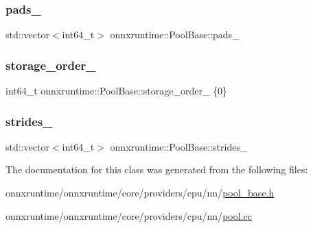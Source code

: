 \subsubsection{\texorpdfstring{pads\+\_\+}{pads\_}}
{\footnotesize\ttfamily std\+::vector$<$int64\+\_\+t$>$ onnxruntime\+::\+Pool\+Base\+::pads\+\_\+\hspace{0.3cm}{\ttfamily [protected]}}

\mbox{\label{classonnxruntime_1_1PoolBase_a8c54de261d31ff7a10f2727759768906}} 
\subsubsection{\texorpdfstring{storage\+\_\+order\+\_\+}{storage\_order\_}}
{\footnotesize\ttfamily int64\+\_\+t onnxruntime\+::\+Pool\+Base\+::storage\+\_\+order\+\_\+ \{0\}\hspace{0.3cm}{\ttfamily [protected]}}

\mbox{\label{classonnxruntime_1_1PoolBase_a12246aa19006cba0dfb1fd125108bb91}} 
\subsubsection{\texorpdfstring{strides\+\_\+}{strides\_}}
{\footnotesize\ttfamily std\+::vector$<$int64\+\_\+t$>$ onnxruntime\+::\+Pool\+Base\+::strides\+\_\+\hspace{0.3cm}{\ttfamily [protected]}}



The documentation for this class was generated from the following files\+:\begin{DoxyCompactItemize}
\item 
onnxruntime/onnxruntime/core/providers/cpu/nn/\mbox{\hyperlink{pool__base_8h}{pool\+\_\+base.\+h}}\item 
onnxruntime/onnxruntime/core/providers/cpu/nn/\mbox{\hyperlink{cpu_2nn_2pool_8cc}{pool.\+cc}}\end{DoxyCompactItemize}

